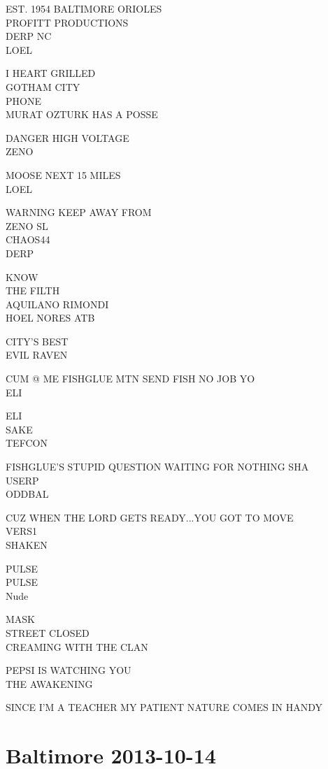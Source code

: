 \documentclass[10pt,letterpaper]{article}
\begin{document}
EST. 1954 BALTIMORE ORIOLES\\
PROFITT PRODUCTIONS\\
DERP NC\\
LOEL

I HEART GRILLED\\
GOTHAM CITY\\
PHONE\\
MURAT OZTURK HAS A POSSE

DANGER HIGH VOLTAGE\\
ZENO

MOOSE NEXT 15 MILES\\
LOEL

WARNING KEEP AWAY FROM\\
ZENO SL\\
CHAOS44\\
DERP

KNOW\\
THE FILTH\\
AQUILANO RIMONDI\\
HOEL NORES ATB

CITY'S BEST\\
EVIL RAVEN

CUM @ ME FISHGLUE MTN SEND FISH NO JOB YO\\
ELI

ELI\\
SAKE\\
TEFCON

FISHGLUE'S STUPID QUESTION WAITING FOR NOTHING SHA\\
USERP\\
ODDBAL

CUZ WHEN THE LORD GETS READY...YOU GOT TO MOVE\\
VERS1\\
SHAKEN

PULSE\\
PULSE\\
Nude

MASK\\
STREET CLOSED\\
CREAMING WITH THE CLAN

PEPSI IS WATCHING YOU\\
THE AWAKENING

SINCE I'M A TEACHER MY PATIENT NATURE COMES IN HANDY
\

\section*{Baltimore 2013-10-14}
\end{document}
